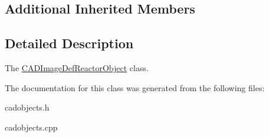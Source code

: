 \subsection*{Additional Inherited Members}


\subsection{Detailed Description}
The \hyperlink{class_c_a_d_image_def_reactor_object}{C\+A\+D\+Image\+Def\+Reactor\+Object} class. 

The documentation for this class was generated from the following files\+:\begin{DoxyCompactItemize}
\item 
cadobjects.\+h\item 
cadobjects.\+cpp\end{DoxyCompactItemize}
